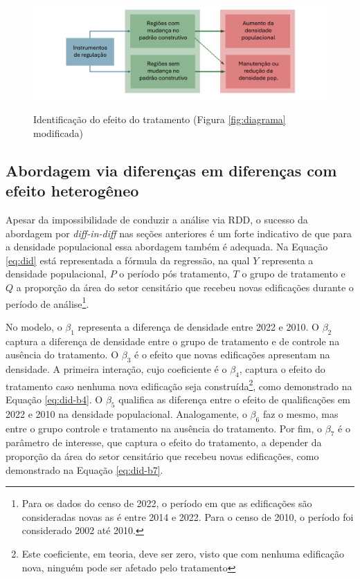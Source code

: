 \begin{figure}[!h]
    \centering
    \caption{Identificação do efeito do tratamento (Figura \ref{fig:diagrama} modificada)}
    \includegraphics[width = \textwidth]{figuras/desenho_proposta_modificado.pdf}
    \label{fig:proposta-mod}
\end{figure}



\clearpage
\subsection{Abordagem via diferenças em diferenças com efeito heterogêneo}

Apesar da impossibilidade de conduzir a análise via RDD, o sucesso da abordagem por \textit{diff-in-diff} nas seções anteriores é um forte indicativo de que para a densidade populacional essa abordagem também é adequada. Na Equação \ref{eq:did} está representada a fórmula da regressão, na qual $Y$ representa a densidade populacional, $P$ o período pós tratamento, $T$ o grupo de tratamento e $Q$ a proporção da área do setor censitário que recebeu novas edificações durante o período de análise\footnote{Para os dados do censo de 2022, o período em que as edificações são consideradas novas as é entre 2014 e 2022. Para o censo de 2010, o período foi considerado 2002 até 2010.}.

No modelo, o $\beta_1$ representa a diferença de densidade entre 2022 e 2010. O $\beta_2$ captura a diferença de densidade entre o grupo de tratamento e de controle na ausência do tratamento. O $\beta_3$ é o efeito que novas edificações apresentam na densidade. A primeira interação, cujo coeficiente é o $\beta_4$, captura o efeito do tratamento caso nenhuma nova edificação seja construída\footnote{Este coeficiente, em teoria, deve ser zero, visto que com nenhuma edificação nova, ninguém pode ser afetado pelo tratamento}, como demonstrado na Equação \ref{eq:did-b4}. O $\beta_5$ qualifica as diferença entre o efeito de qualificações em 2022 e 2010 na densidade populacional. Analogamente, o $\beta_6$ faz o mesmo, mas entre o grupo controle e tratamento na ausência do tratamento. Por fim, o $\beta_7$ é o parâmetro de interesse, que captura o efeito do tratamento, a depender da proporção da área do setor censitário que recebeu novas edificações, como demonstrado na Equação \ref{eq:did-b7}.


